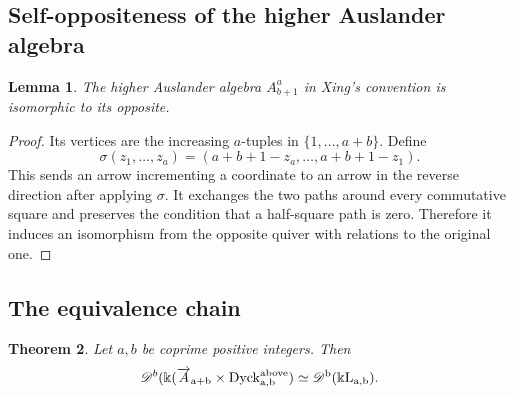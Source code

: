\documentclass[12pt,a4paper,english,reqno]{amsart}
\theoremstyle{plain}
\newtheorem{theorem}{Theorem}[section]
\newtheorem{lemma}[theorem]{Lemma}
\theoremstyle{definition}
\newcommand{\kk}{\Bbbk}
\newcommand{\Dyck}{\operatorname{Dyck}}
\newcommand{\Db}[1]{{\mathscr D}^b(#1)}
\newcommand{\ovr}{\rm \overrightarrow}
\begin{document}
\subsection{Self-oppositeness of the higher Auslander algebra}

\begin{lemma}
\label{lem:A-self-op}
The higher Auslander algebra $A_{b+1}^{a}$ in Xing's convention is
isomorphic to its opposite.
\end{lemma}

\begin{proof}
Its vertices are the increasing $a$-tuples in
$\{1,\ldots,a+b\}$.  Define
\begin{equation}
 \sigma(z_1,\ldots,z_a)
 =
 (a+b+1-z_a,\ldots,a+b+1-z_1).
\label{eq:sigma}
\end{equation}
This sends an arrow incrementing a coordinate to an arrow in the reverse
direction after applying $\sigma$.  It exchanges the two paths around every
commutative square and preserves the condition that a half-square path is
zero.  Therefore it induces an isomorphism from the opposite quiver with
relations to the original one.
\end{proof}

\subsection{The equivalence chain}

\begin{theorem}
\label{thm:CLR-conjecture}
Let $a,b$ be coprime positive integers.  Then
\[
 \Db{\kk(\ovr A_{a+b}\times\Dyck^{\mathrm{above}}_{a,b}}
 \simeq
 \Db{\kk L_{a,b}}.
\]
\end{theorem}
\end{document}
